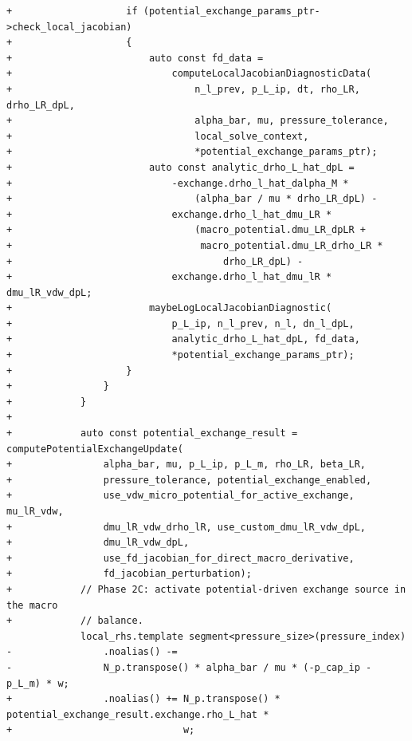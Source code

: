 \documentclass[10pt]{article}
\begin{document}
\begin{lstlisting}
+                    if (potential_exchange_params_ptr->check_local_jacobian)
+                    {
+                        auto const fd_data =
+                            computeLocalJacobianDiagnosticData(
+                                n_l_prev, p_L_ip, dt, rho_LR, drho_LR_dpL,
+                                alpha_bar, mu, pressure_tolerance,
+                                local_solve_context,
+                                *potential_exchange_params_ptr);
+                        auto const analytic_drho_L_hat_dpL =
+                            -exchange.drho_l_hat_dalpha_M *
+                                (alpha_bar / mu * drho_LR_dpL) -
+                            exchange.drho_l_hat_dmu_LR *
+                                (macro_potential.dmu_LR_dpLR +
+                                 macro_potential.dmu_LR_drho_LR *
+                                     drho_LR_dpL) -
+                            exchange.drho_l_hat_dmu_lR * dmu_lR_vdw_dpL;
+                        maybeLogLocalJacobianDiagnostic(
+                            p_L_ip, n_l_prev, n_l, dn_l_dpL,
+                            analytic_drho_L_hat_dpL, fd_data,
+                            *potential_exchange_params_ptr);
+                    }
+                }
+            }
+
+            auto const potential_exchange_result = computePotentialExchangeUpdate(
+                alpha_bar, mu, p_L_ip, p_L_m, rho_LR, beta_LR,
+                pressure_tolerance, potential_exchange_enabled,
+                use_vdw_micro_potential_for_active_exchange, mu_lR_vdw,
+                dmu_lR_vdw_drho_lR, use_custom_dmu_lR_vdw_dpL,
+                dmu_lR_vdw_dpL,
+                use_fd_jacobian_for_direct_macro_derivative,
+                fd_jacobian_perturbation);
+            // Phase 2C: activate potential-driven exchange source in the macro
+            // balance.
             local_rhs.template segment<pressure_size>(pressure_index)
-                .noalias() -=
-                N_p.transpose() * alpha_bar / mu * (-p_cap_ip - p_L_m) * w;
+                .noalias() += N_p.transpose() * potential_exchange_result.exchange.rho_L_hat *
+                              w;
 

\end{lstlisting}
\end{document}
